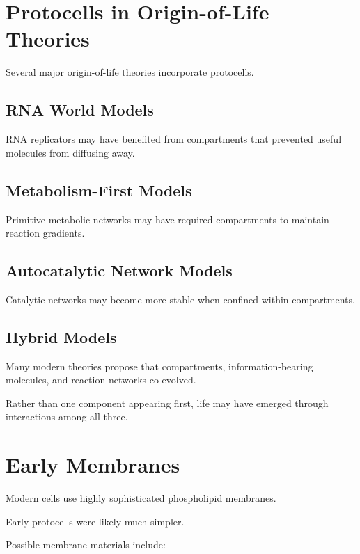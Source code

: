 \documentclass[
  oneside,
  openany]{book}
\begin{document}
\section{Protocells in Origin-of-Life Theories}\label{protocells-in-origin-of-life-theories}

Several major origin-of-life theories incorporate protocells.

\subsection{RNA World Models}\label{rna-world-models}

RNA replicators may have benefited from compartments that prevented useful molecules from diffusing away.

\subsection{Metabolism-First Models}\label{metabolism-first-models}

Primitive metabolic networks may have required compartments to maintain reaction gradients.

\subsection{Autocatalytic Network Models}\label{autocatalytic-network-models}

Catalytic networks may become more stable when confined within compartments.

\subsection{Hybrid Models}\label{hybrid-models}

Many modern theories propose that compartments, information-bearing molecules, and reaction networks co-evolved.

Rather than one component appearing first, life may have emerged through interactions among all three.

\section{Early Membranes}\label{early-membranes}

Modern cells use highly sophisticated phospholipid membranes.

Early protocells were likely much simpler.

Possible membrane materials include:
\end{document}
